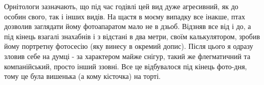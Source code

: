 
Орнітологи зазначають, що під час
годівлі цей вид дуже агресивний, як до особин свого, так і інших видів. На
щастя в моєму випадку все інакше, птах дозволив заглядати йому фотоапаратом
мало не в дзьоб. Відзняв все від і до, а під кінець взагалі знахабнів і з
відстані в два метри, своїм калькулятором, зробив йому портретну фотосесію (яку
винесу в окремий допис). Після цього я одразу зловив себе на думці - за
характером майже снігур, такий же флегматичний та компанійський, просто інший
ззовні. Все це відбувалося під кінець фото-дня, тому це була вишенька (а кому
кісточка) на торті.

